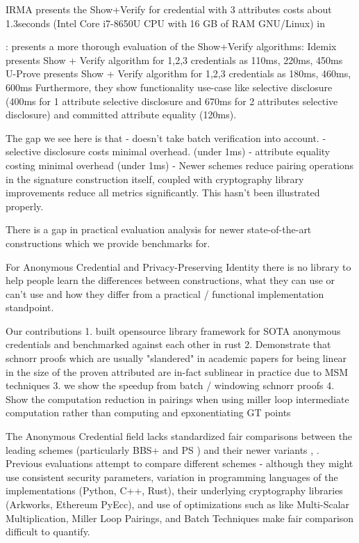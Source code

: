 IRMA \cite{fischer-hubner_towards_2013} presents the Show+Verify for credential with 3 attributes costs about 1.3seconds (Intel Core i7-8650U CPU with 16 GB of RAM GNU/Linux) in \cite{zhang_passo_2021}

\cite{habib_evaluation_2016}: presents a more thorough evaluation of the Show+Verify algorithms:
Idemix presents Show + Verify algorithm for 1,2,3 credentials as 110ms, 220ms, 450ms
U-Prove presents Show + Verify algorithm for 1,2,3 credentials as 180ms, 460ms, 600ms
Furthermore, they show functionality use-case like selective disclosure (400ms for 1 attribute selective disclosure and 670ms for 2 attributes selective disclosure) and committed attribute equality (120ms). 

The gap we see here is that 
- doesn't take batch verification into account.
- selective disclosure costs minimal overhead. (under 1ms)
- attribute equality costing minimal overhead (under 1ms)
- Newer schemes \cite{camenisch_anonymous_2016, tomescu_utt_2022} reduce pairing operations in the signature construction itself, coupled with cryptography library improvements reduce all metrics significantly. 
This hasn't been illustrated properly. 

There is a gap in practical evaluation analysis for newer state-of-the-art constructions which we provide benchmarks for.



For Anonymous Credential and Privacy-Preserving Identity there is no library to help people learn the differences between constructions, what they can use or can't use and how they differ from a practical / functional implementation standpoint. 

Our contributions
1. built opensource library framework for SOTA anonymous credentials and benchmarked against each other in rust
2. Demonstrate that schnorr proofs which are usually "slandered" in academic papers for being linear in the size of the proven attributed are in-fact sublinear in practice due to MSM techniques
3. we show the speedup from batch / windowing schnorr proofs 
4. Show the computation reduction in pairings when using miller loop intermediate computation rather than computing and epxonentiating GT points



The Anonymous Credential field lacks standardized fair comparisons between the leading schemes (particularly BBS+ \cite{hutchison_constant-size_2006} and PS \cite{sako_short_2016}) and their newer variants \cite{camenisch_anonymous_2016}, \cite{tomescu_utt_2022}. Previous evaluations attempt to compare different schemes - although they might use consistent security parameters, variation in programming languages of the implementations (Python, C++, Rust), their underlying cryptography libraries (Arkworks, Ethereum PyEcc), and use of optimizations such as like Multi-Scalar Multiplication, Miller Loop Pairings, and Batch Techniques make fair comparison difficult to quantify. 



